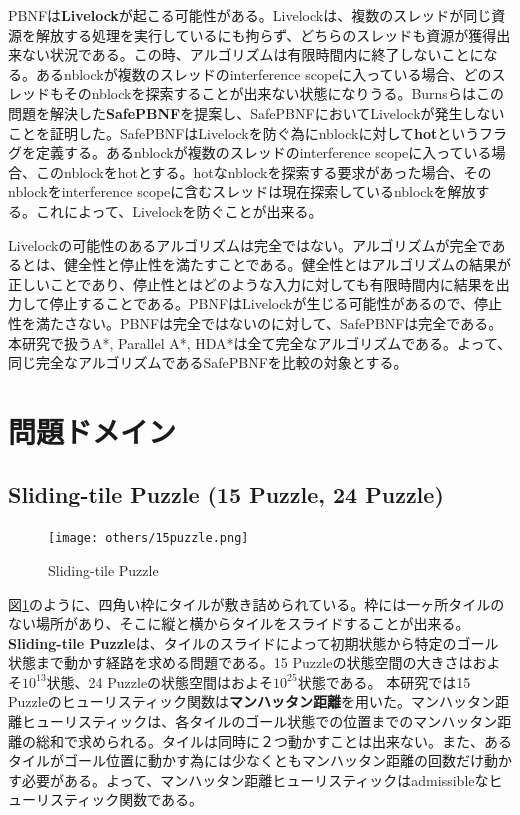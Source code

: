 \documentclass[uplatex]{jsarticle}
\begin{document}
PBNFは\textbf{Livelock}が起こる可能性がある。Livelockは、複数のスレッドが同じ資源を解放する処理を実行しているにも拘らず、どちらのスレッドも資源が獲得出来ない状況である。この時、アルゴリズムは有限時間内に終了しないことになる。あるnblockが複数のスレッドのinterference scopeに入っている場合、どのスレッドもそのnblockを探索することが出来ない状態になりうる。Burnsらはこの問題を解決した\textbf{SafePBNF}を提案し、SafePBNFにおいてLivelockが発生しないことを証明した。SafePBNFはLivelockを防ぐ為にnblockに対して\textbf{hot}というフラグを定義する。あるnblockが複数のスレッドのinterference scopeに入っている場合、このnblockをhotとする。hotなnblockを探索する要求があった場合、そのnblockをinterference scopeに含むスレッドは現在探索しているnblockを解放する。これによって、Livelockを防ぐことが出来る。
\newline

Livelockの可能性のあるアルゴリズムは完全ではない。アルゴリズムが完全であるとは、健全性と停止性を満たすことである。健全性とはアルゴリズムの結果が正しいことであり、停止性とはどのような入力に対しても有限時間内に結果を出力して停止することである。PBNFはLivelockが生じる可能性があるので、停止性を満たさない。PBNFは完全ではないのに対して、SafePBNFは完全である。本研究で扱うA*, Parallel A*, HDA*は全て完全なアルゴリズムである。よって、同じ完全なアルゴリズムであるSafePBNFを比較の対象とする。


\newpage

\section{問題ドメイン}
\label{sec:domain}

\subsection{Sliding-tile Puzzle (15 Puzzle, 24 Puzzle)}

\begin{figure}
	\centering
	\texttt{[image: others/15puzzle.png]}
	\caption{Sliding-tile Puzzle}
	\label{fig:15puzzle}
\end{figure}%
図\ref{fig:15puzzle}のように、四角い枠にタイルが敷き詰められている。枠には一ヶ所タイルのない場所があり、そこに縦と横からタイルをスライドすることが出来る。\textbf{Sliding-tile Puzzle}は、タイルのスライドによって初期状態から特定のゴール状態まで動かす経路を求める問題である。15 Puzzleの状態空間の大きさはおよそ$10^{13}$状態、24 Puzzleの状態空間はおよそ$10^{25}$状態である。 本研究では15 Puzzleのヒューリスティック関数は\textbf{マンハッタン距離}を用いた。マンハッタン距離ヒューリスティックは、各タイルのゴール状態での位置までのマンハッタン距離の総和で求められる。タイルは同時に２つ動かすことは出来ない。また、あるタイルがゴール位置に動かす為には少なくともマンハッタン距離の回数だけ動かす必要がある。よって、マンハッタン距離ヒューリスティックはadmissibleなヒューリスティック関数である。
\newline
\end{document}
